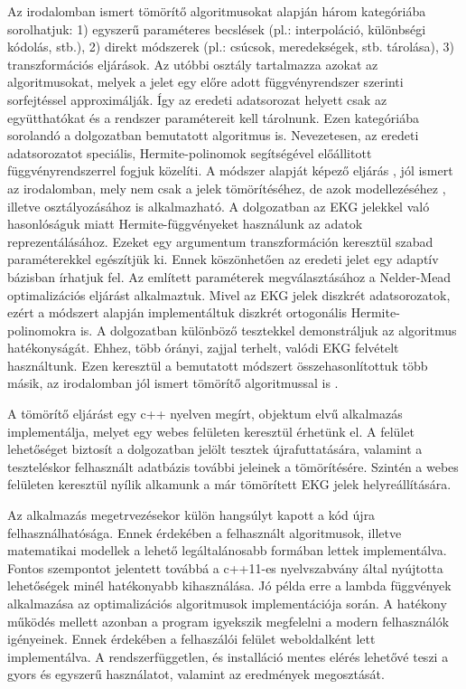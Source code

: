 \documentclass[oneside,titlepage,12pt,a4paper]{report}
\begin{document}
Az irodalomban ismert tömörítő algoritmusokat \cite{ecgDataCompressionTech} alapján három kategóriába sorolhatjuk: 1) egyszerű paraméteres becslések (pl.: interpoláció, különbségi kódolás, stb.), 2) direkt módszerek (pl.: csúcsok, meredekségek, stb. tárolása), 3) transzformációs eljárások. Az utóbbi osztály tartalmazza azokat az algoritmusokat, melyek a jelet egy előre adott függvényrendszer szerinti sorfejtéssel approximálják. Így az eredeti adatsorozat helyett csak az együtthatókat és a rendszer paramétereit kell tárolnunk. Ezen kategóriába sorolandó a dolgozatban bemutatott algoritmus is. Nevezetesen, az eredeti adatsorozatot speciális, Hermite-polinomok segítségével előállitott függvényrendszerrel fogjuk közelíti. A módszer alapját képező eljárás \cite{origCikk}, jól ismert az irodalomban, mely nem csak a jelek tömörítéséhez, de azok modellezéséhez \cite{methodForQRSEval}, illetve osztályozásához \cite{detAcuteMyo, clusterMaps} is alkalmazható. A dolgozatban az EKG jelekkel való hasonlóságuk miatt Hermite-függvényeket használunk az adatok reprezentálásához. Ezeket egy argumentum transzformáción keresztül szabad paraméterekkel egészítjük ki. Ennek köszönhetően az eredeti jelet egy adaptív bázisban írhatjuk fel. Az említett paraméterek megválasztásához a Nelder-Mead optimalizációs eljárást alkalmaztuk. Mivel az EKG jelek diszkrét adatsorozatok, ezért a módszert \cite{kvadCikk} alapján implementáltuk diszkrét ortogonális Hermite-polinomokra is. A dolgozatban különböző tesztekkel demonstráljuk az algoritmus hatékonyságát. Ehhez, több órányi, zajjal terhelt, valódi EKG felvételt használtunk. Ezen keresztül a bemutatott módszert összehasonlítottuk több másik, az irodalomban jól ismert tömörítő algoritmussal is \cite{ecgCompIrregular}. 

A tömörítő eljárást egy c++ nyelven megírt, objektum elvű alkalmazás implementálja, melyet egy webes felületen keresztül érhetünk el. A felület lehetőséget biztosít a dolgozatban jelölt tesztek újrafuttatására, valamint a teszteléskor felhasznált adatbázis további jeleinek a tömörítésére. Szintén a webes felületen keresztül nyílik alkamunk a már tömörített EKG jelek helyreállítására. 

Az alkalmazás megetrvezésekor külön hangsúlyt kapott a kód újra felhasználhatósága. Ennek érdekében a felhasznált algoritmusok, illetve matematikai modellek a lehető legáltalánosabb formában lettek implementálva. Fontos szempontot jelentett továbbá a c++11-es nyelvszabvány által nyújtotta lehetőségek minél hatékonyabb kihasználása. Jó példa erre a lambda függvények alkalmazása az optimalizációs algoritmusok implementációja során. A hatékony működés mellett azonban a program igyekszik megfelelni a modern felhasználók igényeinek. Ennek érdekében a felhaszálói felület weboldalként lett implementálva. A rendszerfüggetlen, és installáció mentes elérés lehetővé teszi a gyors és egyszerű használatot, valamint az eredmények megosztását.  
\end{document}
